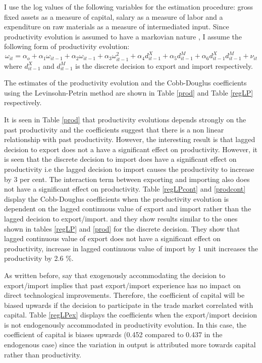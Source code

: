 \documentclass[11pt]{article}
\begin{document}

I use the log values of the following variables for the estimation
procedure:  gross fixed assets as a measure of capital, salary
as a measure of labor and a expenditure on raw materials as a measure
of intermediated input. Since productivity evolution is  assumed to
have a markovian nature , I assume the following form of productivity
evolution:
$$ \omega_{it} = \alpha_{o} + \alpha_{1}\omega_{it-1} +
\alpha_{2}\omega_{it-1} + \alpha_{3}\omega_{it-1}^{2}+
\alpha_{4}d_{it-1}^{X} + \alpha_{5} d_{it-1}^{M} +
\alpha_{6}d_{it-1}^{X}d_{it-1}^{M}  + \nu_{it}
$$ 
where $d_{it-1}^{X}$ and $d_{it-1}^{M}$ is the discrete decision to
export and import respectively. 

The estimates of the productivity evolution and  the Cobb-Douglus
coefficients  using the Levinsohn-Petrin
method are shown in Table \ref{prod}  and 
Table \ref{regLP} respectively. 

It is seen in Table \ref{prod} that productivity evolutions depends strongly
on the past productivity and the coefficients suggest that there is a
non linear relationship with  past
productivity. However, the interesting result is that lagged decision to export does not a have
a significant effect on productivity. However, it is seen that the
discrete decision to import does have a significant effect on productivity i.e the
lagged decision to import causes the productivity to increase by 3 per
cent. The interaction term between exporting and importing also does
not have a significant effect on productivity. 
Table \ref{regLPcont} and \ref{prodcont} display the Cobb-Douglus coefficients when the
productivity evolution is dependent on the lagged continuous value of export
and import rather than the lagged decision to export/import.
and they show results similar to the ones shown in tables \ref{regLP}
and \ref{prod} for the discrete decision. They show that lagged
continuous value of export does not have a significant effect on
productivity, increase in lagged continuous value of import  by 1 unit
increases the productivity by 2.6 \%.  
 



As written before, \textcite{de2013detecting} say that exogenously accommodating the
decision to export/import implies that
past export/import experience has no impact on direct technological
improvements. Therefore, the coefficient of capital will be biased
upwards if the decision to participate in the trade market correlated with capital. Table
\ref{regLPex} displays the coefficients when the export/import
decision is not endogenously accommodated in 
productivity evolution. In this case, the coefficient of capital is
biases upwards (0.452 compared to 0.437 in the endogenous case)  since
the variation in output is attributed more towards capital rather than productivity.   

\end{document}
